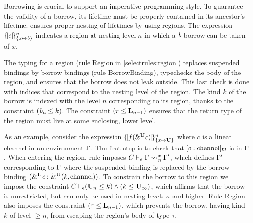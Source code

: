 

Borrowing is crucial to support an imperative programming style.
To guarantee the validity of a borrow, its lifetime must be properly contained in its
ancestor's lifetime. \lang ensures proper nesting of lifetimes by using
regions. The expression $\region{\Sone x\BORROW}{e}$ indicates a
region at nesting level $n$ in which a $\BORROW$-borrow can be taken of $x$.

The typing for a region (rule {\sc Region} in \cref{selectrules:region})
replaces suspended bindings by borrow bindings
(rule {\sc BorrowBinding}), typechecks the body
of the region, and ensures that the borrow does not leak outside.
This last check is done with indices that correspond to the nesting
level of the region. The kind $k$ of the borrow is indexed with the level $n$
corresponding to its region, thanks to the constraint $(\BORROW_n\lk
k)$. The constraint $\Cleq{\tau}{\klin_{n-1}}$ ensures that
the return type of the region must live at some enclosing, lower level.

As an example, consider the expression $\region{\Sone x\IBORROW}{f(\borrow[\IBORROW]{c})}$
where $c$ is a linear channel in an environment $\E$.
The first step is to check that $\svar[\IBORROW]{c}{\text{channel}}$
is in $\E$.
When entering the region, rule  imposes
$\lregion{C}{x}{\E}{\E'}$, which defines $\E'$
corresponding to $\E$ where the suspended binding is replaced by the
borrow binding  $\bvar{\borrow[\IBORROW]{c}}{\borrowty[\IBORROW]{k}{\text{channel}}}$.
To constrain the borrow to this region we impose the constraint
$\entail{C}{(\kun_n\lk k) \wedge (k \lk\kun_\infty)}$, which affirms
that the borrow is unrestricted, but can only be used in nesting
levels $n$ and higher.
%
%
Rule {\sc Region} also imposes the constraint
$\Cleq{\tau}{\klin_{n-1}}$, which prevents the borrow, having kind $k$ of level
$\geq n$, from escaping the region's body of type $\tau$.


